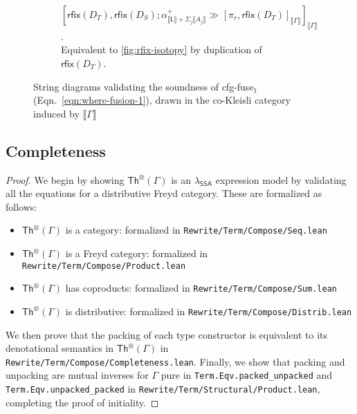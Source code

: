 \documentclass[acmsmall,screen,review]{acmart}
\newcommand{\ms}[1]{\ensuremath{\mathsf{#1}}}
\newcommand{\brle}[1]{{\textsf{#1}}}
\newcommand{\dnt}[1]{\llbracket{#1}\rrbracket}
\newcommand{\rfix}[1]{\ms{rfix}(#1)}
\newcommand{\rseq}[3]{#2 \gg_{#1} #3}
\newcommand{\envcop}[3]{[#2, #3]_{#1}}
\newcommand{\isotopessa}{\(\lambda_{\ms{SSA}}\)}
\begin{document}
\begin{figure}
\begin{subfigure}[t]{\textwidth}
    \caption{
      $\envcop{\dnt{\Gamma}}{
        \rfix{D_T}
      }{
        \rseq{}
          {\rfix{D_S} ; \alpha^+_{\dnt{\ms{L}} + \Sigma_j\dnt{A_j}}}
          {\envcop{\dnt{\Gamma}}{\pi_r}{\rfix{D_T}}}
      }$. \\
      Equivalent to \ref{fig:rfix-isotopy} by duplication of $\rfix{D_T}$.
    }
    \label{fig:rfix-lhs}
  \end{subfigure}%
  \caption{
    String diagrams validating the soundness of \brle{cfg-fuse$_1$}
    (Eqn.~\ref{eqn:where-fusion-1}), drawn in the co-Kleisli category induced by $\dnt{\Gamma}$
  } 
  \Description{}
  \label{fig:string-diagram-fusion}
\end{figure}

\subsection{Completeness}

\completenessexpr*

\label{proof:complete-expr}

\begin{proof}
  We begin by showing $\ms{Th}^\otimes(\Gamma)$ is an \isotopessa{} expression model by validating
  all the equations for a distributive Freyd category. These are formalized as follows:
  \begin{itemize}
    \item $\ms{Th}^\otimes(\Gamma)$ is a category: formalized in
    \texttt{Rewrite/Term/Compose/Seq.lean}
    \item $\ms{Th}^\otimes(\Gamma)$ is a Freyd category: formalized in
    \texttt{Rewrite/Term/Compose/Product.lean}
    \item $\ms{Th}^\otimes(\Gamma)$ has coproducts: formalized in
    \texttt{Rewrite/Term/Compose/Sum.lean}
    \item $\ms{Th}^\otimes(\Gamma)$ is distributive: formalized in
    \texttt{Rewrite/Term/Compose/Distrib.lean}
  \end{itemize}
  We then prove that the packing of each type constructor is equivalent to its denotational
  semantics in $\ms{Th}^\otimes(\Gamma)$ in \texttt{Rewrite/Term/Compose/Completeness.lean}.
  Finally, we show that packing and unpacking are mutual inverses for $\Gamma$ pure in
  \texttt{Term.Eqv.packed_unpacked} and \texttt{Term.Eqv.unpacked_packed} in
  \texttt{Rewrite/Term/Structural/Product.lean}, completing the proof of initiality.
\end{proof}
\end{document}
